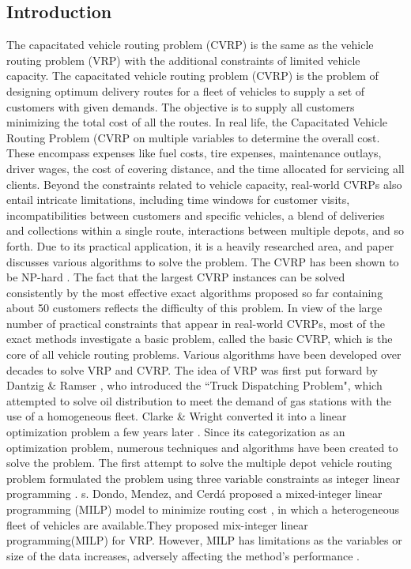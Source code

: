 \documentclass[conference]{IEEEtran}
\begin{document}
\begin{abstract1}
\section{Introduction}
The capacitated vehicle routing problem (CVRP) is the same as the vehicle routing problem (VRP) with the additional constraints of limited vehicle capacity. The capacitated vehicle routing problem (CVRP) is the problem of designing optimum delivery routes for a fleet of vehicles to supply a set of customers with given demands\cite{CVRP2022}. The objective is to supply all customers minimizing the total cost of all the routes.  
In real life, the Capacitated Vehicle Routing Problem (CVRP on multiple variables to determine the overall cost. These encompass expenses like fuel costs, tire expenses, maintenance outlays, driver wages, the cost of covering distance, and the time allocated for servicing all clients. Beyond the constraints related to vehicle capacity, real-world CVRPs also entail intricate limitations, including time windows for customer visits, incompatibilities between customers and specific vehicles, a blend of deliveries and collections within a single route, interactions between multiple depots, and so forth.
Due to its practical application, it is a heavily researched area, and paper \cite{laporte2000classical} discusses various algorithms to solve the problem.
The CVRP has been shown to be NP-hard \cite{ardon2022reinforcement}. The fact that the largest CVRP instances can be solved consistently by the most effective exact algorithms proposed so far containing about 50 customers reflects the difficulty of this problem. In view of the large number of practical constraints that appear in real-world CVRPs, most of the exact methods investigate a basic problem, called the basic CVRP, which is the core of all vehicle routing problems.
Various algorithms have been developed over decades to solve VRP and CVRP. The idea of VRP was first put forward by Dantzig \& Ramser \cite{braekers2016vehicle}, who introduced the ``Truck Dispatching Problem", which attempted to solve oil distribution to meet the demand of gas stations with the use of a homogeneous fleet. Clarke \& Wright converted it into a linear optimization problem a few years later \cite{clarke1964scheduling}. Since its categorization as an optimization problem, numerous techniques and algorithms have been created to solve the problem.
The first attempt to solve the multiple depot vehicle routing problem formulated the problem using three variable constraints as integer linear programming \cite{montoya2015literature}.  s. Dondo, Mendez, and Cerdá proposed a mixed-integer linear programming (MILP) model to minimize routing cost \cite{dondo2011multi}, in which a heterogeneous fleet of vehicles are available.They proposed mix-integer linear programming(MILP) for VRP. However, MILP has limitations as the variables or size of the data increases, adversely affecting the method's performance \cite{urbanucci2018limits}. 


\end{abstract1}
\end{document}
